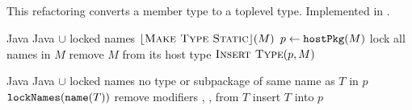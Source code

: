 \subsection{}
This refactoring converts a member type to a toplevel type. Implemented in .

\begin{algorithm}
\caption{$\refactoring{Move Member Type to Toplevel}(M : \type{MemberType})$}
\label{alg:MoveMemberTypeToToplevel}
\begin{algorithmic}[1]
\REQUIRE Java
\ENSURE Java $\cup$ locked names
\medskip
{}
  \STATE $\lfloor\textsc{Make Type Static}\rfloor(M)$
\ENDIF
\STATE $p \leftarrow \text{\texttt{hostPkg}}(M)$
\STATE lock all names in $M$
\STATE remove $M$ from its host type
\STATE $\textsc{Insert Type}(p, M)$
\end{algorithmic}
\end{algorithm}

\begin{algorithm}
\caption{$\refactoring{Insert Type}(p : \type{Package}, T : \type{ClassOrInterface})$}
\label{alg:InsertType}
\begin{algorithmic}[1]
\REQUIRE Java
\ENSURE Java $\cup$ locked names
\medskip
\STATE \assert no type or subpackage of same name as $T$ in $p$
\STATE $\text{\texttt{lockNames}}(\text{\texttt{name}}(T))$
\STATE remove modifiers , ,  from $T$
\STATE insert $T$ into $p$
\end{algorithmic}
\end{algorithm}

